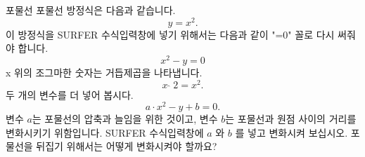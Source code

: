 \begin{surferPage}{포물선}
포물선 방정식은 다음과 같습니다.  \[y=x^2.\]
이 방정식을 SURFER 수식입력창에 넣기 위해서는 다음과 같이 "=0" 꼴로 다시 써줘야 합니다.
\[x^2-y=0\]
x 위의 조그마한 숫자는 거듭제곱을 나타냅니다.  
\[ x  \,\hat{\ } \, 2 =x^2.\]
두 개의 변수를 더 넣어 봅시다.
\[a \cdot x^2-y+b=0.\]
변수 $a$는 포물선의 압축과 늘임을 위한 것이고, 변수 $b$는 포물선과 원점 사이의 거리를 변화시키기 위함입니다. 
\newline
SURFER 수식입력창에 $a$ 와 $b$ 를 넣고 변화시켜 보십시오. 포물선을 뒤집기 위해서는 어떻게 변화시켜야 할까요?
\end{surferPage}
